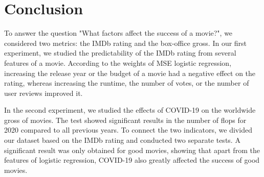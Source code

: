 \documentclass{article}
\begin{document}
\section{Conclusion}
To answer the question "What factors affect the success of a movie?", we considered two metrics: the IMDb rating and the box-office gross. In our first experiment, we studied the predictability of the IMDb rating from several features of a movie. According to the weights of MSE logistic regression, increasing the release year or the budget of a movie had a negative effect on the rating, whereas increasing the runtime, the number of votes, or the number of user reviews improved it.

In the second experiment, we studied the effects of COVID-19 on the worldwide gross of movies. The test showed significant results in the number of flops for 2020 compared to all previous years. To connect the two indicators, we divided our dataset based on the IMDb rating and conducted two separate tests. A significant result was only obtained for good movies, showing that apart from the features of logistic regression, COVID-19 also greatly affected the success of good movies.



\end{document}
